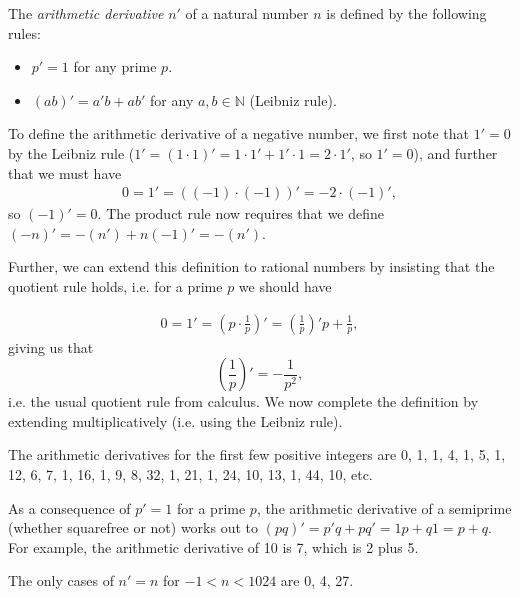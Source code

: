 \documentclass[12pt]{article}
\begin{document}
The {\em arithmetic derivative} $n'$ of a natural number $n$ is defined by the following rules:
\begin{itemize}
\item $p'=1$ for any prime $p$.
\item $(ab)'=a'b+ab'$ for any $a,b \in \mathbb{N}$ (Leibniz rule).
\end{itemize}
To define the arithmetic derivative of a negative number, we first note that $1'=0$ by the Leibniz rule ($1'=(1\cdot 1)'=1\cdot 1'+1'\cdot 1=2\cdot 1'$, so $1'=0$), and further that we must have 
\begin{align*}
0=1'=\left((-1)\cdot(-1)\right)'=-2\cdot(-1)',
\end{align*}
so $(-1)'=0$.  The product rule now requires that we define $(-n)'=-(n')+n(-1)'=-(n')$.

Further, we can extend this definition to rational numbers by insisting that the quotient rule holds, i.e. for a prime $p$ we should have

\begin{align*}
0=1'=\left(p\cdot\frac{1}{p}\right)'=\left(\frac{1}{p}\right)'p+\frac{1}{p},
\end{align*}
giving us that $$\left(\frac{1}{p}\right)'=-\frac{1}{p^2},$$ i.e. the usual quotient rule from calculus.  We now complete the definition by extending multiplicatively (i.e. using the Leibniz rule).

The arithmetic derivatives for the first few positive integers are 0, 1, 1, 4, 1, 5, 1, 12, 6, 7, 1, 16, 1, 9, 8, 32, 1, 21, 1, 24, 10, 13, 1, 44, 10, etc.

As a consequence of $p' = 1$ for a prime $p$, the arithmetic derivative of a semiprime (whether squarefree or not) works out to $(pq)' = p'q + pq' = 1p + q1 = p + q$. For example, the arithmetic derivative of 10 is 7, which is 2 plus 5.

The only cases of $n' = n$ for $-1 < n < 1024$ are 0, 4, 27.
\end{document}
